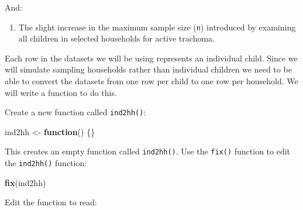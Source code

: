 \documentclass[12pt,a4paper]{book}
\newenvironment{Shaded}{\begin{snugshade}}{\end{snugshade}}
\newcommand{\KeywordTok}[1]{\textcolor[rgb]{0.13,0.29,0.53}{\textbf{#1}}}
\newcommand{\StringTok}[1]{\textcolor[rgb]{0.31,0.60,0.02}{#1}}
\newcommand{\OtherTok}[1]{\textcolor[rgb]{0.56,0.35,0.01}{#1}}
\newcommand{\ControlFlowTok}[1]{\textcolor[rgb]{0.13,0.29,0.53}{\textbf{#1}}}
\newcommand{\OperatorTok}[1]{\textcolor[rgb]{0.81,0.36,0.00}{\textbf{#1}}}
\newcommand{\NormalTok}[1]{#1}
\providecommand{\tightlist}{%
  \setlength{\itemsep}{0pt}\setlength{\parskip}{0pt}}
\theoremstyle{definition}
\theoremstyle{definition}
\theoremstyle{definition}
\theoremstyle{remark}
\begin{document}
And:

\begin{enumerate}
\def\labelenumi{\arabic{enumi}.}
\setcounter{enumi}{1}
\tightlist
\item
  The slight increase in the maximum sample size (\texttt{n}) introduced
  by examining all children in selected households for active trachoma.
\end{enumerate}

Each row in the datasets we will be using represents an individual
child. Since we will simulate sampling households rather than individual
children we need to be able to convert the datasets from one row per
child to one row per household. We will write a function to do this.

Create a new function called \texttt{ind2hh()}:

\begin{Shaded}
\begin{Highlighting}[]
\NormalTok{ind2hh <-}\StringTok{ }\ControlFlowTok{function}\NormalTok{() \{\}}
\end{Highlighting}
\end{Shaded}

This creates an empty function called \texttt{ind2hh()}. Use the
\texttt{fix()} function to edit the \texttt{ind2hh()} function:

\begin{Shaded}
\begin{Highlighting}[]
\KeywordTok{fix}\NormalTok{(ind2hh)}
\end{Highlighting}
\end{Shaded}

Edit the function to read:

\begin{Shaded}
\end{Shaded}
\end{document}
